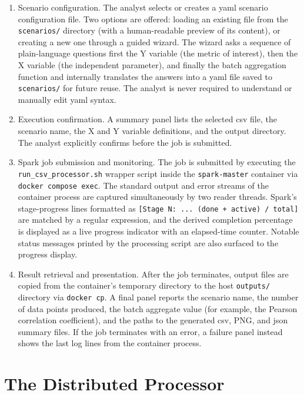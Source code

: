\begin{enumerate}
\item Scenario configuration. The analyst selects or creates a \gls{yaml} scenario
configuration file. Two options are offered: loading an existing file from the
\texttt{scenarios/} directory (with a human-readable preview of its content), or creating a new
one through a guided wizard. The wizard asks a sequence of plain-language questions first the Y
variable (the metric of interest), then the X variable (the independent parameter), and finally
the batch aggregation function and internally translates the answers into a \gls{yaml} file
saved to \texttt{scenarios/} for future reuse. The analyst is never required to understand or
manually edit \gls{yaml} syntax.

\item Execution confirmation. A summary panel lists the selected \gls{csv} file, the
scenario name, the X and Y variable definitions, and the output directory. The analyst explicitly
confirms before the job is submitted.

\item Spark job submission and monitoring. The job is submitted by executing the
\texttt{run\_csv\_processor.sh} wrapper script inside the \texttt{spark-master} container via
\texttt{docker compose exec}. The standard output and error streams of the container process are
captured simultaneously by two reader threads. Spark's stage-progress lines formatted as
\texttt{[Stage~N:~...~(done~+~active)~/~total]} are matched by a regular expression, and the
derived completion percentage is displayed as a live progress indicator with an elapsed-time
counter. Notable status messages printed by the processing script are also surfaced to the
progress display.

\item Result retrieval and presentation. After the job terminates, output files are
copied from the container's temporary directory to the host \texttt{outputs/} directory via
\texttt{docker cp}. A final panel reports the scenario name, the number of data points produced,
the batch aggregate value (for example, the Pearson correlation coefficient), and the paths to
the generated \gls{csv}, PNG, and \gls{json} summary files. If the job terminates with an error,
a failure panel instead shows the last log lines from the container process.

\end{enumerate}

\section{The Distributed  Processor}
\label{sec:csv-processor}

